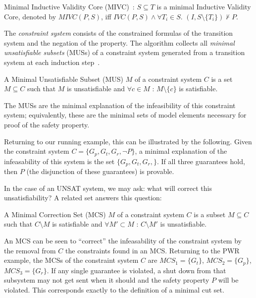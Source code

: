 \begin{definition}
Minimal Inductive Validity Core (MIVC)~\cite{Ghassabani2017EfficientGO}: $S \subseteq T$ is a minimal Inductive Validity Core, denoted by $\mathit{MIVC(P,S)}$, iff $\mathit{IVC(P,S)} \land \forall T_i \in S$. $(I, S \setminus \{T_i\}) \not \vdash P$.
\end{definition}

The {\em constraint system} consists of the constrained formulas of the transition system and the negation of the property. The \aivcalg algorithm collects all {\em minimal unsatisfiable subsets} (MUSs) of a constraint system generated from a transition system at each induction step~\cite{Ghassabani2017EfficientGO,bendik2018online}. 

\begin{definition}
A Minimal Unsatisfiable Subset (MUS) $M$ of a constraint system $C$ is a set $M \subseteq C$ such that $M$ is unsatisfiable and $\forall c \in M$ : $M \setminus \{c\}$ is satisfiable.
\end{definition}
The MUSs are the minimal explanation of the infeasibility of this constraint system; equivalently, these are the minimal sets of model elements necessary for proof of the safety property.

Returning to our running example, this can be illustrated by the following. Given the constraint system $C = \{G_p, G_t, G_r, \neg P\}$, a minimal explanation of the infeasability of this system is the set $\{G_p, G_t, G_r,\}$. If all three guarantees hold, then $P$ (the disjunction of these guarantees) is provable. 

In the case of an UNSAT system, we may ask: what will correct this unsatisfiability? A related set answers this question: 
\begin{definition}
A Minimal Correction Set (MCS) $M$ of a constraint system $C$ is a subset $M\subseteq C$ such that $C \setminus M$ is satisfiable and $\forall M' \subset M$ : $C \setminus M'$ is unsatisfiable.
\end{definition}
An MCS can be seen to ``correct'' the infeasability of the constraint system by the removal from $C$ the constraints found in an MCS. Returning to the PWR example, the MCSs of the constraint system $C$ are $\mathit{MCS}_1 = \{G_t\}$, $\mathit{MCS}_2 = \{G_p\}$, $\mathit{MCS}_3 = \{G_r\}$. If any single guarantee is violated, a shut down from that subsystem may not get sent when it should and the safety property $P$ will be violated. This corresponds exactly to the definition of a minimal cut set.

